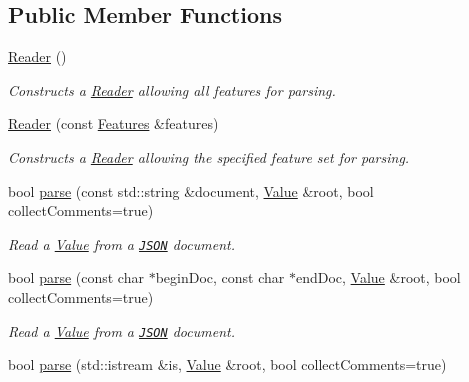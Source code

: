 \subsection*{Public Member Functions}
\begin{DoxyCompactItemize}
\item 
\mbox{\label{class_json_1_1_reader_a0b3c4e24c8393354bab57a6ba3ffc27f}} 
\hyperlink{class_json_1_1_reader_a0b3c4e24c8393354bab57a6ba3ffc27f}{Reader} ()
\begin{DoxyCompactList}\small\item\em Constructs a \hyperlink{class_json_1_1_reader}{Reader} allowing all features for parsing. \end{DoxyCompactList}\item 
\mbox{\label{class_json_1_1_reader_a45f17831118337309180313e93ac33f8}} 
\hyperlink{class_json_1_1_reader_a45f17831118337309180313e93ac33f8}{Reader} (const \hyperlink{class_json_1_1_features}{Features} \&features)
\begin{DoxyCompactList}\small\item\em Constructs a \hyperlink{class_json_1_1_reader}{Reader} allowing the specified feature set for parsing. \end{DoxyCompactList}\item 
bool \hyperlink{class_json_1_1_reader_af1da6c976ad1e96c742804c3853eef94}{parse} (const std\+::string \&document, \hyperlink{class_json_1_1_value}{Value} \&root, bool collect\+Comments=true)
\begin{DoxyCompactList}\small\item\em Read a \hyperlink{class_json_1_1_value}{Value} from a \href{http://www.json.org}{\tt J\+S\+ON} document. \end{DoxyCompactList}\item 
bool \hyperlink{class_json_1_1_reader_ac71ef2b64c7c27b062052e692af3fb32}{parse} (const char $\ast$begin\+Doc, const char $\ast$end\+Doc, \hyperlink{class_json_1_1_value}{Value} \&root, bool collect\+Comments=true)
\begin{DoxyCompactList}\small\item\em Read a \hyperlink{class_json_1_1_value}{Value} from a \href{http://www.json.org}{\tt J\+S\+ON} document. \end{DoxyCompactList}\item 
bool \hyperlink{class_json_1_1_reader_a8d0347e6b47343e4bc68be7ecdb9c4e9}{parse} (std\+::istream \&is, \hyperlink{class_json_1_1_value}{Value} \&root, bool collect\+Comments=true)

\end{DoxyCompactItemize}
